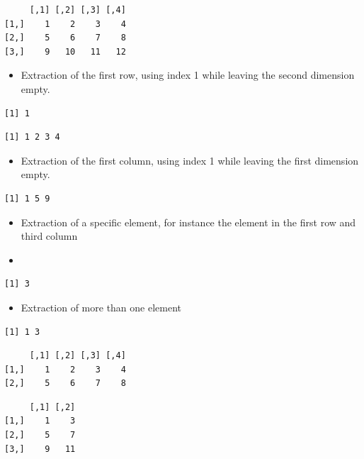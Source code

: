 \documentclass[
  letterpaper,
  DIV=11,
  numbers=noendperiod]{scrreprt}
\providecommand{\tightlist}{%
  \setlength{\itemsep}{0pt}\setlength{\parskip}{0pt}}
\begin{document}
\begin{verbatim}
     [,1] [,2] [,3] [,4]
[1,]    1    2    3    4
[2,]    5    6    7    8
[3,]    9   10   11   12
\end{verbatim}

\begin{itemize}
\tightlist
\item
  Extraction of the first row, using index 1 while leaving the second
  dimension empty.
\end{itemize}

\begin{verbatim}
[1] 1
\end{verbatim}

\begin{verbatim}
[1] 1 2 3 4
\end{verbatim}

\begin{itemize}
\tightlist
\item
  Extraction of the first column, using index 1 while leaving the first
  dimension empty.
\end{itemize}

\begin{verbatim}
[1] 1 5 9
\end{verbatim}

\begin{itemize}
\tightlist
\item
  Extraction of a specific element, for instance the element in the
  first row and third column
\item
\end{itemize}

\begin{verbatim}
[1] 3
\end{verbatim}

\begin{itemize}
\tightlist
\item
  Extraction of more than one element
\end{itemize}

\begin{verbatim}
[1] 1 3
\end{verbatim}

\begin{verbatim}
     [,1] [,2] [,3] [,4]
[1,]    1    2    3    4
[2,]    5    6    7    8
\end{verbatim}

\begin{verbatim}
     [,1] [,2]
[1,]    1    3
[2,]    5    7
[3,]    9   11
\end{verbatim}
\end{document}
